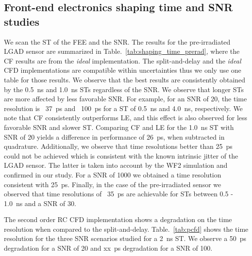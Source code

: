 \documentclass[preprint,1p]{elsarticle}
\begin{document}
\subsection{Front-end electronics shaping time and SNR studies}\label{sec:shaping_time}
We scan the ST of the FEE and the SNR. The results for the pre-irradiated LGAD sensor are summarized in Table.~\ref{tab:shaping_time_prerad},
where the CF results are from the \textit{ideal} implementation. The {\color{red} split-and-delay}
 and the \textit{ideal} CFD implementations are compatible within uncertainties thus we only use one table for those results.
 We observe that the best results are consistently obtained by the 0.5~\si{ns} and 1.0~\si{ns} STs regardless of the SNR. We observe that
 longer STs are more affected by less favorable SNR. For example, for an SNR of 20, the time resolution is ~37~\si{ps} and ~100~\si{ps} for a
ST of 0.5~\si{ns} and 4.0~\si{ns}, respectively. We note that CF consistently outperforms LE, and this effect is also observed
 for less favorable SNR and slower ST. Comparing CF and LE for the 1.0~\si{ns} ST with SNR of 20 yields a difference in performance of
 26~\si{ps}, when subtracted in quadrature. Additionally, we observe that time resolutions better than 25~\si{ps} could not be achieved which
 is consistent with the known intrinsic jitter of the LGAD sensor. The latter is taken into account by the WF2 simulation and
confirmed in our study. For a SNR of 1000 we obtained a time resolution consistent with 25~\si{ps}.
Finally, in the case of the pre-irradiated sensor we observed that time resolutions of ~35~\si{ps} are achievable for
STs between 0.5 - 1.0~\si{ns} and a SNR of 30.

The {\color{red} second order RC} CFD implementation shows a degradation on the time resolution when compared
to the {\color{red} split-and-delay}. Table.~\ref{tab:pcfd} shows the time resolution for the three SNR scenarios
studied for a 2~\si{ns} ST. We observe a 50~\si{ps} degradation for a SNR of 20 and  xx~\si{ps} degradation for a SNR of 100.
\end{document}
